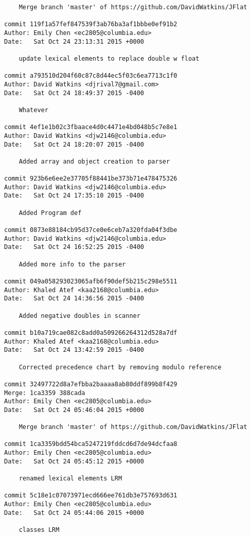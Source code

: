 \begin{verbatim}
    Merge branch 'master' of https://github.com/DavidWatkins/JFlat

commit 119f1a57fef847539f3ab76ba3af1bbbe0ef91b2
Author: Emily Chen <ec2805@columbia.edu>
Date:   Sat Oct 24 23:13:31 2015 +0000

    update lexical elements to replace double w float

commit a793510d204f60c87c8d44ec5f03c6ea7713c1f0
Author: David Watkins <djrival7@gmail.com>
Date:   Sat Oct 24 18:49:37 2015 -0400

    Whatever

commit 4ef1e1b02c3fbaace4d0c4471e4bd048b5c7e8e1
Author: David Watkins <djw2146@columbia.edu>
Date:   Sat Oct 24 18:20:07 2015 -0400

    Added array and object creation to parser

commit 923b6e6ee2e37705f88441be373b71e478475326
Author: David Watkins <djw2146@columbia.edu>
Date:   Sat Oct 24 17:35:10 2015 -0400

    Added Program def

commit 0873e88184cb95d37ce0e6ceb7a320fda04f3dbe
Author: David Watkins <djw2146@columbia.edu>
Date:   Sat Oct 24 16:52:25 2015 -0400

    Added more info to the parser

commit 049a058293023065afb6f90def5b215c298e5511
Author: Khaled Atef <kaa2168@columbia.edu>
Date:   Sat Oct 24 14:36:56 2015 -0400

    Added negative doubles in scanner

commit b10a719cae082c8add0a509266264312d528a7df
Author: Khaled Atef <kaa2168@columbia.edu>
Date:   Sat Oct 24 13:42:59 2015 -0400

    Corrected precedence chart by removing modulo reference

commit 32497722d8a7efbba2baaaa8ab80ddf899b8f429
Merge: 1ca3359 388cada
Author: Emily Chen <ec2805@columbia.edu>
Date:   Sat Oct 24 05:46:04 2015 +0000

    Merge branch 'master' of https://github.com/DavidWatkins/JFlat

commit 1ca3359bdd54bca5247219fddcd6d7de94dcfaa8
Author: Emily Chen <ec2805@columbia.edu>
Date:   Sat Oct 24 05:45:12 2015 +0000

    renamed lexical elements LRM

commit 5c18e1c07073971ecd666ee761db3e757693d631
Author: Emily Chen <ec2805@columbia.edu>
Date:   Sat Oct 24 05:44:06 2015 +0000

    classes LRM


\end{verbatim}
